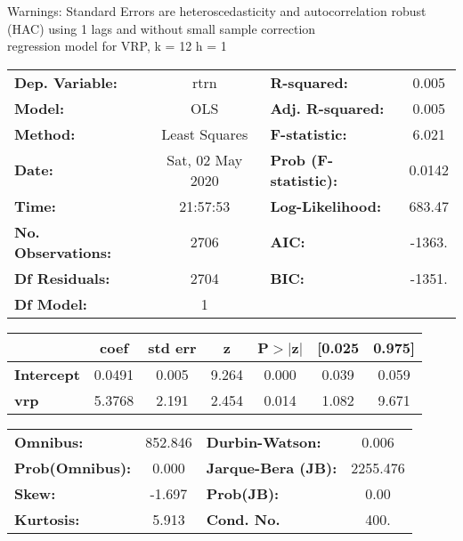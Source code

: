 Warnings: \newline
 [1] Standard Errors are heteroscedasticity and autocorrelation robust (HAC) using 1 lags and without small sample correction\\ 

regression model for VRP, k = 12 h = 1\begin{center}
\begin{tabular}{lclc}
\toprule
\textbf{Dep. Variable:}    &       rtrn       & \textbf{  R-squared:         } &     0.005   \\
\textbf{Model:}            &       OLS        & \textbf{  Adj. R-squared:    } &     0.005   \\
\textbf{Method:}           &  Least Squares   & \textbf{  F-statistic:       } &     6.021   \\
\textbf{Date:}             & Sat, 02 May 2020 & \textbf{  Prob (F-statistic):} &   0.0142    \\
\textbf{Time:}             &     21:57:53     & \textbf{  Log-Likelihood:    } &    683.47   \\
\textbf{No. Observations:} &        2706      & \textbf{  AIC:               } &    -1363.   \\
\textbf{Df Residuals:}     &        2704      & \textbf{  BIC:               } &    -1351.   \\
\textbf{Df Model:}         &           1      & \textbf{                     } &             \\
\bottomrule
\end{tabular}
\begin{tabular}{lcccccc}
                   & \textbf{coef} & \textbf{std err} & \textbf{z} & \textbf{P$> |$z$|$} & \textbf{[0.025} & \textbf{0.975]}  \\
\midrule
\textbf{Intercept} &       0.0491  &        0.005     &     9.264  &         0.000        &        0.039    &        0.059     \\
\textbf{vrp}       &       5.3768  &        2.191     &     2.454  &         0.014        &        1.082    &        9.671     \\
\bottomrule
\end{tabular}
\begin{tabular}{lclc}
\textbf{Omnibus:}       & 852.846 & \textbf{  Durbin-Watson:     } &    0.006  \\
\textbf{Prob(Omnibus):} &   0.000 & \textbf{  Jarque-Bera (JB):  } & 2255.476  \\
\textbf{Skew:}          &  -1.697 & \textbf{  Prob(JB):          } &     0.00  \\
\textbf{Kurtosis:}      &   5.913 & \textbf{  Cond. No.          } &     400.  \\
\bottomrule
\end{tabular}
\end{center}

